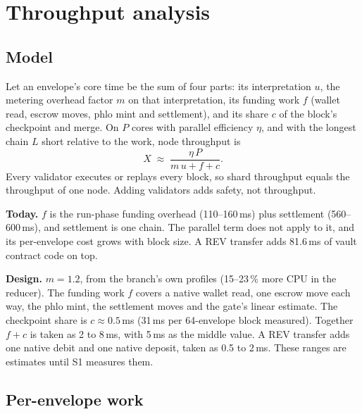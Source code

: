 \documentclass[11pt]{article}
\begin{document}
\section{Throughput analysis}\label{sec:throughput}

\subsection{Model}

Let an envelope's core time be the sum of four parts: its interpretation $u$, the metering overhead factor $m$ on that interpretation, its funding work $f$ (wallet read, escrow moves, phlo mint and settlement), and its share $c$ of the block's checkpoint and merge. On $P$ cores with parallel efficiency $\eta$, and with the longest chain $L$ short relative to the work, node throughput is
\[
X \;\approx\; \frac{\eta\,P}{m\,u + f + c}.
\]
Every validator executes or replays every block, so shard throughput equals the throughput of one node. Adding validators adds safety, not throughput.

\textbf{Today.} $f$ is the run-phase funding overhead (110--160\,ms) plus settlement (560--600\,ms), and settlement is one chain. The parallel term does not apply to it, and its per-envelope cost grows with block size. A REV transfer adds 81.6\,ms of vault contract code on top.

\textbf{Design.} $m = 1.2$, from the branch's own profiles (15--23\,\% more CPU in the reducer). The funding work $f$ covers a native wallet read, one escrow move each way, the phlo mint, the settlement moves and the gate's linear estimate. The checkpoint share is $c \approx 0.5$\,ms (31\,ms per 64-envelope block measured). Together $f + c$ is taken as 2 to 8\,ms, with 5\,ms as the middle value. A REV transfer adds one native debit and one native deposit, taken as 0.5 to 2\,ms. These ranges are estimates until S1 measures them.

\subsection{Per-envelope work}
\end{document}
